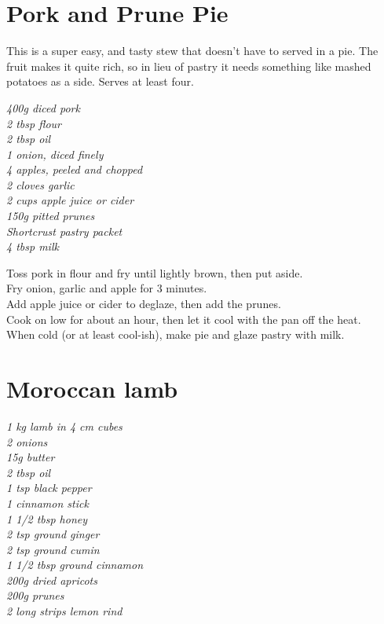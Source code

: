 \documentclass{tufte-book}
\begin{document}
\section{Pork and Prune Pie}

This is a super easy, and tasty stew that doesn't have to served in a pie. The fruit makes it quite rich, so in lieu of pastry it needs something like mashed potatoes as a side. Serves at least four.

\smallskip
\emph{400g diced pork
\\2 tbsp flour
\\2 tbsp oil
\\1 onion, diced finely
\\4 apples, peeled and chopped
\\2 cloves garlic
\\2 cups apple juice or cider
\\150g pitted prunes
\\Shortcrust pastry packet
\\4 tbsp milk}

\smallskip
Toss pork in flour and fry until lightly brown, then put aside.
\\Fry onion, garlic and apple for 3 minutes.
\\Add apple juice or cider to deglaze, then add the prunes.
\\Cook on low for about an hour, then let it cool with the pan off the heat.
\\When cold (or at least cool-ish), make pie and glaze pastry with milk.

\newpage

\section{Moroccan lamb}

\emph{1 kg lamb in 4 cm cubes
\\2 onions
\\15g butter
\\2 tbsp oil
\\1 tsp black pepper
\\1 cinnamon stick
\\1 1/2 tbsp honey
\\2 tsp ground ginger
\\2 tsp ground cumin
\\1 1/2 tbsp ground cinnamon
\\200g dried apricots
\\200g prunes
\\2 long strips lemon rind}
\end{document}
